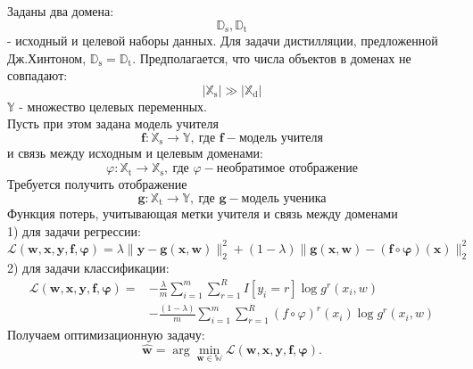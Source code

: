 Заданы два домена: $$\mathbb{D}_{\text{s}}, \mathbb{D}_{\text{t}}$$ - исходный и целевой наборы данных. Для задачи дистилляции, предложенной Дж.Хинтоном, $\mathbb{D}_{\text{s}}=\mathbb{D}_{\text{t}}$. Предполагается, что числа объектов в доменах не совпадают: $$|\mathbb{X}_{\text{s}}| \gg |\mathbb{X}_{\text{d}}|$$
$\mathbb{Y}$ - множество целевых переменных.\\
Пусть при этом задана модель учителя
$$\textbf{f}: \mathbb{X}_{\text{s}} \rightarrow \mathbb{Y}, \ \text{где } \mathbf{f}-\text{модель учителя}$$
и связь между исходным и целевым доменами:
$$\varphi: \mathbb{X}_{\text{t}} \rightarrow \mathbb{X}_{\text{s}}, \ \text{где } \varphi-\text{необратимое отображение}$$ 
Требуется получить отображение $$\textbf{g}: \mathbb{X}_{\text{t}} \rightarrow \mathbb{Y}, \ \text{где } \mathbf{g}-\text{модель ученика}$$
Функция потерь, учитывающая метки учителя и связь между доменами\\
1) для задачи регрессии:
$$\mathcal{L}(\mathbf{w,x,y,f,\varphi})=\lambda\|\mathbf{y}-\mathbf{g}(\mathbf{x},\mathbf{w})\|_{2}^{2}+(1-\lambda)\|\mathbf{g}(\mathbf{x},\mathbf{w})-(\mathbf{f}\circ \mathbf{\varphi})(\mathbf{x})\|_{2}^{2}$$
2) для задачи классификации:
\[
\begin{aligned}
\mathcal{L}(\mathbf{w,x,y,f,\varphi})=&-\frac{\lambda}{m}\sum\limits_{i=1}^{m}\sum\limits_{r=1}^{R}I[y_{i}=r]\log{g^{r}(x_{i},w)}\\
&-\frac{(1-\lambda)}{m}\sum\limits_{i=1}^{m}\sum\limits_{r=1}^{R}(f\circ \varphi)^{r}(x_{i})\log{g^{r}(x_{i},w)}
\end{aligned}
\]
Получаем оптимизационную задачу:
$$\hat{\mathbf{w}} = \arg\min_{\mathbf{w} \in \mathbb{W}} \mathcal{L}(\mathbf{w,x,y,f,\varphi}).$$
